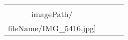 \begin{table}
\begin{tabular}{cccc}
\texttt{[image: \\imagePath/\\fileName/IMG\_5416.jpg]} 
\end{tabular}
\end{table}
